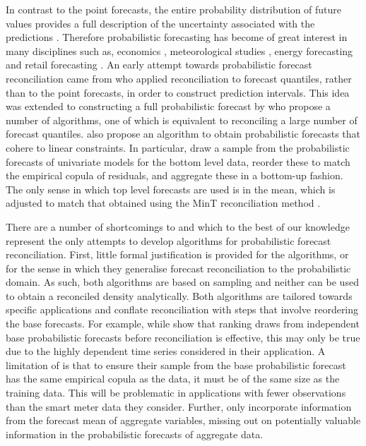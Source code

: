 \documentclass[11pt]{article}
\theoremstyle{definition}
\begin{document}
In contrast to the point forecasts, the entire probability distribution of future values provides a full description of the uncertainty associated with the predictions \citep{Abramson1995, Gneiting2014}. Therefore probabilistic forecasting has become of great interest in many disciplines such as, economics \citep{zarnowitz1987, rossi2014}, meteorological studies \citep{pinson2009, mclean2013}, energy forecasting \citep{wytock2013, BenTaieb2017} and retail forecasting \citep{bose2017}. An early attempt towards probabilistic forecast reconciliation came from \cite{ShaHyn2017} who applied reconciliation to forecast quantiles, rather than to the point forecasts, in order to construct prediction intervals. This idea was extended to constructing a full probabilistic forecast by \citet{JeoEtAl2019} who propose a number of algorithms, one of which is equivalent to reconciling a large number of forecast quantiles. \citet{Taieb2017} also propose an algorithm to obtain probabilistic forecasts that cohere to linear constraints. In particular, \citet{Taieb2017} draw a sample from the probabilistic forecasts of univariate models for the bottom level data, reorder these to match the empirical copula of residuals, and aggregate these in a bottom-up fashion. The only sense in which top level forecasts are used is in the mean, which is adjusted to match that obtained using the MinT reconciliation method \citep{WicEtAl2019}.

There are a number of shortcomings to \citet{JeoEtAl2019} and \citet{Taieb2017} which to the best of our knowledge represent the only attempts to develop algorithms for probabilistic forecast reconciliation. First, little formal justification is provided for the algorithms, or for the sense in which they generalise forecast reconciliation to the probabilistic domain. As such, both algorithms are based on sampling and neither can be used to obtain a reconciled density analytically. Both algorithms are tailored towards specific applications and conflate reconciliation with steps that involve reordering the base forecasts. For example, while \citet{JeoEtAl2019} show that ranking draws from independent base probabilistic forecasts before reconciliation is effective, this may only be true due to the highly dependent time series considered in their application. A limitation of \citet{Taieb2017} is that to ensure their sample from the base probabilistic forecast has the same empirical copula as the data, it must be of the same size as the training data. This will be problematic in applications with fewer observations than the smart meter data they consider. Further, \citet{Taieb2017} only incorporate information from the forecast mean of aggregate variables, missing out on potentially valuable information in the probabilistic forecasts of aggregate data.
\end{document}
